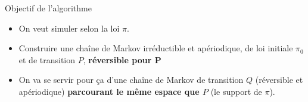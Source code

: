 \documentclass[9pt,ignorenonframetext,]{beamer}
\providecommand{\tightlist}{%
  \setlength{\itemsep}{0pt}\setlength{\parskip}{0pt}}
\begin{document}
\begin{frame}{Objectif de l'algorithme}
\protect\hypertarget{objectif-de-lalgorithme}{}

\begin{itemize}
\tightlist
\item
  On veut simuler selon la loi \(\pi\).
\item
  Construire une chaîne de Markov irréductible et apériodique, de loi
  initiale \(\pi_0\) et de transition \(P\), \textbf{réversible pour P}
\item
  On va se servir pour ça d'une chaîne de Markov de transition \(Q\)
  (réversible et apériodique) \textbf{parcourant le même espace que
  \(P\)} (le support de \(\pi\)).
\end{itemize}

\end{frame}
\end{document}
